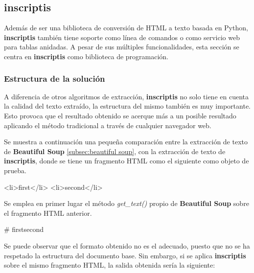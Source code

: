 \subsection{inscriptis}
\label{subsec:inscriptis}

Además de ser una biblioteca de conversión de HTML a texto basada en Python, \textbf{inscriptis}
\cite{inscriptis} también tiene soporte como línea de comandos o como servicio web para tablas anidadas.
A pesar de sus múltiples funcionalidades, esta sección se centra en \textbf{inscriptis} como biblioteca de
programación.

\subsubsection{Estructura de la solución}
\label{subsubsec:estructura de la solucion}

A diferencia de otros algoritmos de extracción, \textbf{inscriptis} no solo tiene en cuenta la calidad del 
texto extraído, la estructura del mismo también es muy importante. Esto provoca que el resultado obtenido 
se acerque más a un posible resultado aplicando el método tradicional a través de cualquier navegador web.

Se muestra a continuación una pequeña comparación entre la extracción de texto de \textbf{Beautiful Soup}
\ref{subsec:beautiful soup}, con la extracción de texto de \textbf{inscriptis}, donde se tiene un fragmento 
HTML como el siguiente como objeto de prueba.

\begin{Schunk}
  \begin{Soutput}
      <li>first</li>
      <li>second</li>
  \end{Soutput}
\end{Schunk}

Se emplea en primer lugar el método \emph{get\_text()} propio de \textbf{Beautiful Soup} sobre el fragmento 
HTML anterior.

\begin{Schunk}
  \begin{Soutput}
    # firstsecond
  \end{Soutput}
\end{Schunk}

Se puede observar que el formato obtenido no es el adecuado, puesto que no se ha respetado la estructura
del documento base. Sin embargo, si se aplica \textbf{inscriptis} sobre el mismo fragmento HTML, la salida 
obtenida sería la siguiente:

